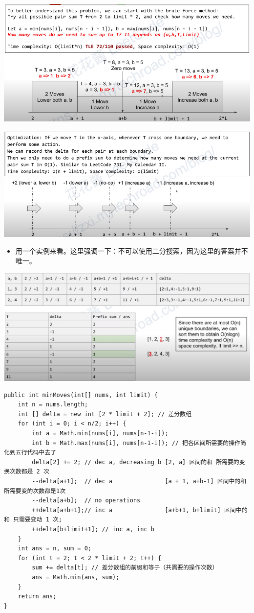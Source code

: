 \documentclass[9pt, b5paaper]{book}
\begin{document}
\includegraphics[width=.9\linewidth]{./pic/diffArray.png}

\includegraphics[width=.9\linewidth]{./pic/diffArray2.png}
\begin{itemize}
\item 用一个实例来看。这里强调一下：不可以使用二分搜索，因为这里的答案并不唯一。
\end{itemize}

\includegraphics[width=.9\linewidth]{./pic/diffArray3.png}

\begin{verbatim}
public int minMoves(int[] nums, int limit) {
    int n = nums.length;
    int [] delta = new int [2 * limit + 2]; // 差分数组
    for (int i = 0; i < n/2; i++) {
        int a = Math.min(nums[i], nums[n-1-i]);
        int b = Math.max(nums[i], nums[n-1-i]); // 把各区间所需要的操作简化到五行代码中去了
        delta[2] += 2; // dec a, decreasing b [2, a] 区间的和 所需要的变换次数都是 2 次
        --delta[a+1];  // dec a               [a + 1, a+b-1] 区间中的和 所需要变的次数都是1次
        --delta[a+b];  // no operations
        ++delta[a+b+1];// inc a               [a+b+1, b+limit] 区间中的和 只需要变动 1 次;
        ++delta[b+limit+1]; // inc a, inc b
    }
    int ans = n, sum = 0;
    for (int t = 2; t < 2 * limit + 2; t++) {
        sum += delta[t]; // 差分数组的前缀和等于（共需要的操作次数）
        ans = Math.min(ans, sum);
    }
    return ans;
}
\end{verbatim}
\end{document}
